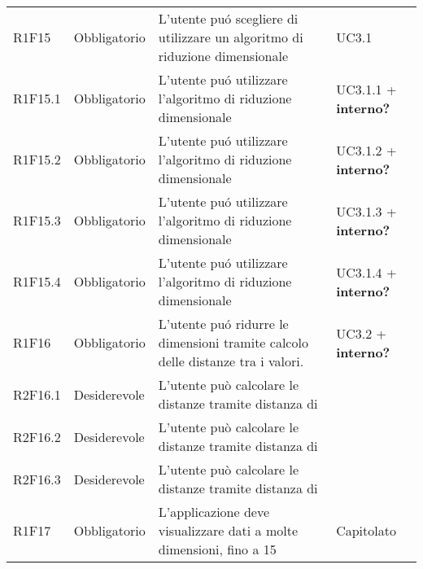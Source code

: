 \begin{center}
\begin{longtable}{C{2cm} | C{3cm} | C{7cm} | C{3.3cm}}
R1F15 & Obbligatorio & L'utente puó scegliere di utilizzare un algoritmo di riduzione dimensionale & UC3.1 \\
R1F15.1 & Obbligatorio & L'utente puó utilizzare l'algoritmo di riduzione dimensionale  & UC3.1.1 + \textbf{interno?} \\
R1F15.2 & Obbligatorio & L'utente puó utilizzare l'algoritmo di riduzione dimensionale  & UC3.1.2 + \textbf{interno?}\\
R1F15.3 & Obbligatorio & L'utente puó utilizzare l'algoritmo di riduzione dimensionale  & UC3.1.3 + \textbf{interno?}\\
R1F15.4 & Obbligatorio & L'utente puó utilizzare l'algoritmo di riduzione dimensionale  & UC3.1.4 + \textbf{interno?}\\
R1F16 & Obbligatorio & L'utente puó ridurre le dimensioni tramite calcolo delle distanze tra i valori. & UC3.2 + \textbf{interno?}\\ 
R2F16.1 & Desiderevole & L'utente può calcolare le distanze tramite distanza di  &  \\
R2F16.2 & Desiderevole & L'utente può calcolare le distanze tramite distanza di  &  \\
R2F16.3 & Desiderevole & L'utente può calcolare le distanze tramite distanza di  &  \\
R1F17 & Obbligatorio & L'applicazione deve visualizzare dati a molte dimensioni, fino a 15 & Capitolato\\

\end{longtable}
\end{center}






